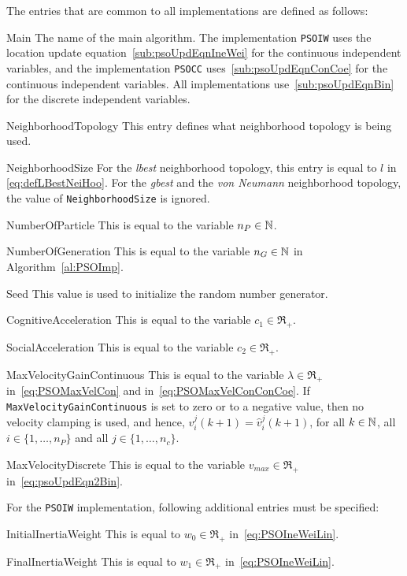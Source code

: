 \noindent
The entries that are common to all implementations are defined as follows:
\begin{codedescription}
\item [Main]
The name of the main algorithm.
The implementation \texttt{PSOIW} uses the location update 
equation~\eqref{sub:psoUpdEqnIneWei} 
for the continuous independent variables,
and the implementation \texttt{PSOCC} 
uses~\eqref{sub:psoUpdEqnConCoe}
for the continuous independent variables.
All implementations use~\eqref{sub:psoUpdEqnBin} for the discrete independent variables.
\item [NeighborhoodTopology]
This entry defines what neighborhood topology is being used.
\item [NeighborhoodSize]
For the {\it lbest} neighborhood topology, 
this entry is equal to $l$ in \eqref{eq:defLBestNeiHoo}.
For the {\it gbest} and the {\it von Neumann} neighborhood topology, 
the value of \texttt{NeighborhoodSize} is ignored.
\item [NumberOfParticle]
This is equal to the variable $n_P \in {\mathbb N}$.
\item [NumberOfGeneration]
This is equal to the variable $n_G \in {\mathbb N}$ in Algorithm~\ref{al:PSOImp}.
\item [Seed]
This value is used to initialize the random number generator.
\item [CognitiveAcceleration]
This is equal to the variable $c_1 \in \Re_+$.
\item [SocialAcceleration]
This is equal to the variable $c_2 \in \Re_+$.
\item [MaxVelocityGainContinuous]
This is equal to the variable $\lambda \in \Re_+$ in~\eqref{eq:PSOMaxVelCon}
and in~\eqref{eq:PSOMaxVelConConCoe}.
If \texttt{MaxVelocityGainContinuous} is set to zero or to a negative value,
then no velocity clamping is used, and hence, $v_i^j(k+1) = \widehat v_i^j(k+1)$,
for all $k \in {\mathbb N}$, all $i \in \{1, \ldots, n_P \}$ and all
$j \in \{1, \ldots, n_c \}$.
\item [MaxVelocityDiscrete]
This is equal to the variable $v_{max} \in \Re_+$ in~\eqref{eq:psoUpdEqn2Bin}.
\end{codedescription}

\vspace{2\baselineskip}
\noindent
For the \texttt{PSOIW} implementation, following additional entries must be
specified:
\begin{codedescription}
\item [InitialInertiaWeight]
This is equal to $w_0 \in \Re_+$ in~\eqref{eq:PSOIneWeiLin}.
\item [FinalInertiaWeight]
This is equal to $w_1 \in \Re_+$ in~\eqref{eq:PSOIneWeiLin}.
\end{codedescription}

